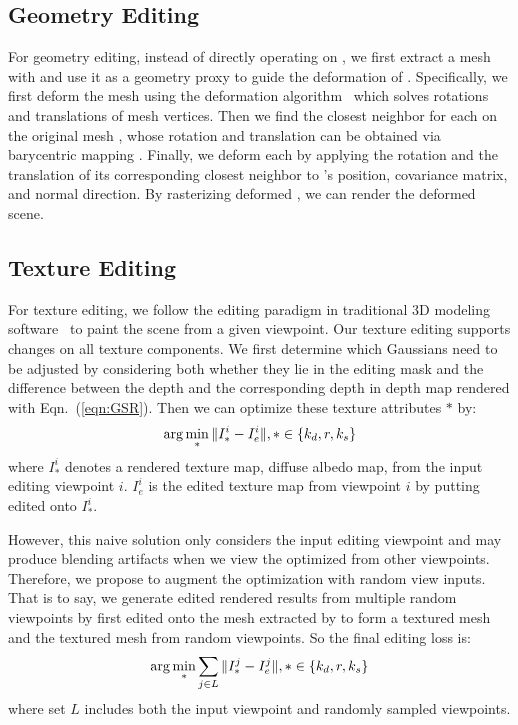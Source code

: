 \subsection{Geometry Editing}
For geometry editing, instead of directly operating on , we first extract a mesh with \neusbranch and use it as a geometry proxy to guide the deformation of . 
Specifically, we first deform the mesh using the  deformation algorithm~\cite{ARAP} which solves  rotations and translations of mesh vertices.  
Then we find the closest neighbor 
for each  on the original mesh , whose rotation and translation can be obtained via barycentric mapping . 
Finally, we deform each  by applying the rotation and the translation of its corresponding closest neighbor to 's position, covariance matrix, and normal direction.
By rasterizing deformed , we can render the deformed scene. 

\subsection{Texture Editing}
\label{sec:texture_edit}
For texture editing, we follow the editing paradigm in traditional 3D modeling software~\cite{blender} to paint the scene from a given viewpoint. 
Our texture editing supports changes on all texture components. 
We first determine which Gaussians need to be adjusted by considering both whether they lie in the editing mask and the difference between the  depth and the corresponding depth in  depth map rendered with Eqn.~(\ref{eqn:GSR}). 
Then we can optimize these  texture attributes $*$ by:
\begin{equation}
\label{eqn:edit_naive}
    {\arg}\min_{*} \|I_{*}^i - I_e^i\|,\space\space\space * \in \{k_d, r, k_s\}
\end{equation}
where $I_{*}^i$ denotes a rendered texture map,  diffuse albedo map, from the input editing viewpoint $i$. 
$I_e^i$ is the edited texture map from viewpoint $i$ by putting edited  onto $I_{*}^i$. 

However, this naive solution only considers the input editing viewpoint and may produce blending artifacts when we view the optimized  from other viewpoints. 
Therefore, we propose to augment the optimization with random view inputs. 
That is to say, we generate edited rendered results from multiple random viewpoints by first  edited  onto the mesh extracted by \neusbranch to form a textured mesh and  the textured mesh from random viewpoints. 
So the final editing loss is: 
\begin{equation}
\label{eqn:edit_improved}
    {\arg}\min_{*} \sum_{j \in L}\|I_{*}^j - I_e^j\|,\space\space\space * \in \{k_d, r, k_s\}
\end{equation}
where set $L$ includes both the input viewpoint and randomly sampled viewpoints.

